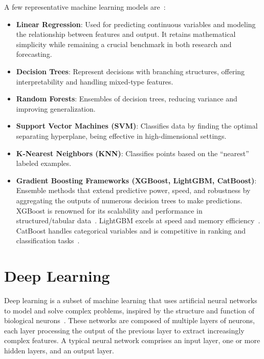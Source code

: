 A few representative machine learning models are~\cite{sarker2021machine}:
\begin{itemize}

    \item \textbf{Linear Regression}: Used for predicting continuous variables and modeling the relationship between features and output.
        It retains mathematical simplicity while remaining a crucial benchmark in both research and forecasting.

    \item \textbf{Decision Trees}: Represent decisions with branching structures, offering interpretability and handling mixed-type features.

    \item \textbf{Random Forests}: Ensembles of decision trees, reducing variance and improving generalization.

    \item \textbf{Support Vector Machines (SVM)}: Classifies data by finding the optimal separating hyperplane, being effective in high-dimensional settings.

    \item \textbf{K-Nearest Neighbors (KNN)}: Classifies points based on the “nearest” labeled examples.

    \item \textbf{Gradient Boosting Frameworks (XGBoost, LightGBM, CatBoost)}: Ensemble methods that extend predictive power, speed, and robustness by aggregating the outputs of numerous decision trees to make predictions.
        XGBoost is renowned for its scalability and performance in structured/tabular data~\cite{chen2016xgboost}.
        LightGBM excels at speed and memory efficiency~\cite{ke2017lightgbm}.
        CatBoost handles categorical variables and is competitive in ranking and classification tasks~\cite{prokhorenkova2018catboost}.
\end{itemize}

\section{Deep Learning}
Deep learning is a subset of machine learning that uses artificial neural networks to model and solve complex problems, inspired by the structure and function of biological neurons~\cite{lecun2015deep}.
These networks are composed of multiple layers of neurons, each layer processing the output of the previous layer to extract increasingly complex features.
A typical neural network comprises an input layer, one or more hidden layers, and an output layer.

